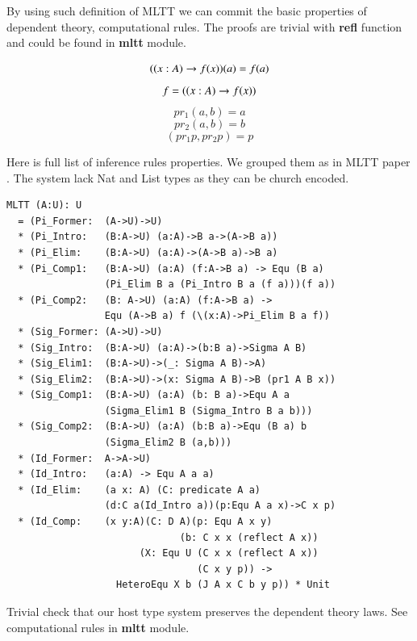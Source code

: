 \documentclass{article}
\begin{document}
By using such definition of MLTT we can commit the basic properties
of dependent theory, computational rules. The proofs are trivial
with {\bf refl} function and could be found in {\bf mltt} module.

\begin{equation} (\\(x:A) \rightarrow f(x))(a) = f(a) \end{equation}
\begin{equation} f = (\\(x:A) \rightarrow f(x)) \end{equation}
\begin{equation} pr_1 (a,b) = a \end{equation}
\begin{equation} pr_2 (a,b) = b \end{equation}
\begin{equation} (pr_1 p,pr_2 p) = p \end{equation}

Here is full list of inference rules properties.
We grouped them as in MLTT paper \cite{Lof84}. The system lack Nat and List
types as they can be church encoded.

\begin{lstlisting}[mathescape=true]
MLTT (A:U): U
  = (Pi_Former:  (A->U)->U)
  * (Pi_Intro:   (B:A->U) (a:A)->B a->(A->B a))
  * (Pi_Elim:    (B:A->U) (a:A)->(A->B a)->B a)
  * (Pi_Comp1:   (B:A->U) (a:A) (f:A->B a) -> Equ (B a)
                 (Pi_Elim B a (Pi_Intro B a (f a)))(f a))
  * (Pi_Comp2:   (B: A->U) (a:A) (f:A->B a) ->
                 Equ (A->B a) f (\(x:A)->Pi_Elim B a f))
  * (Sig_Former: (A->U)->U)
  * (Sig_Intro:  (B:A->U) (a:A)->(b:B a)->Sigma A B)
  * (Sig_Elim1:  (B:A->U)->(_: Sigma A B)->A)
  * (Sig_Elim2:  (B:A->U)->(x: Sigma A B)->B (pr1 A B x))
  * (Sig_Comp1:  (B:A->U) (a:A) (b: B a)->Equ A a
                 (Sigma_Elim1 B (Sigma_Intro B a b)))
  * (Sig_Comp2:  (B:A->U) (a:A) (b:B a)->Equ (B a) b
                 (Sigma_Elim2 B (a,b)))
  * (Id_Former:  A->A->U)
  * (Id_Intro:   (a:A) -> Equ A a a)
  * (Id_Elim:    (a x: A) (C: predicate A a)
                 (d:C a(Id_Intro a))(p:Equ A a x)->C x p)
  * (Id_Comp:    (x y:A)(C: D A)(p: Equ A x y)
                              (b: C x x (reflect A x))
                       (X: Equ U (C x x (reflect A x))
                                 (C x y p)) ->
                   HeteroEqu X b (J A x C b y p)) * Unit
\end{lstlisting}

Trivial check that our host type system preserves the dependent theory laws.
See computational rules in {\bf mltt} module.
\end{document}
